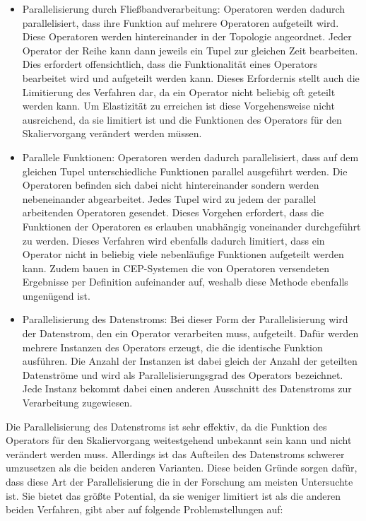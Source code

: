 \begin{itemize}
\item{Parallelisierung durch Fließbandverarbeitung: Operatoren werden dadurch parallelisiert, dass ihre Funktion auf mehrere Operatoren aufgeteilt wird.
Diese Operatoren werden hintereinander in der Topologie angeordnet.
Jeder Operator der Reihe kann dann jeweils ein Tupel zur gleichen Zeit bearbeiten.
Dies erfordert offensichtlich, dass die Funktionalität eines Operators bearbeitet wird und aufgeteilt werden kann.
Dieses Erfordernis stellt auch die Limitierung des Verfahren dar, da ein Operator nicht beliebig oft geteilt werden kann.
Um Elastizität zu erreichen ist diese Vorgehensweise nicht ausreichend, da sie limitiert ist und die Funktionen des Operators für den Skaliervorgang verändert werden müssen.}

\item{Parallele Funktionen: Operatoren werden dadurch parallelisiert, dass auf dem gleichen Tupel unterschiedliche Funktionen parallel ausgeführt werden.
Die Operatoren befinden sich dabei nicht hintereinander sondern werden nebeneinander abgearbeitet.
Jedes Tupel wird zu jedem der parallel arbeitenden Operatoren gesendet.
Dieses Vorgehen erfordert, dass die Funktionen der Operatoren es erlauben unabhängig voneinander durchgeführt zu werden.
Dieses Verfahren wird ebenfalls dadurch limitiert, dass ein Operator nicht in beliebig viele nebenläufige Funktionen aufgeteilt werden kann.
Zudem bauen in CEP-Systemen die von Operatoren versendeten Ergebnisse per Definition aufeinander auf, weshalb diese Methode ebenfalls ungenügend ist.}

\item{Parallelisierung des Datenstroms: Bei dieser Form der Parallelisierung wird der Datenstrom, den ein Operator verarbeiten muss, aufgeteilt.
Dafür werden mehrere Instanzen des Operators erzeugt, die die identische Funktion ausführen.
Die Anzahl der Instanzen ist dabei gleich der Anzahl der geteilten Datenströme und wird als Parallelisierungsgrad des Operators bezeichnet.
Jede Instanz bekommt dabei einen anderen Ausschnitt des Datenstroms zur Verarbeitung zugewiesen.}

\end{itemize}

Die Parallelisierung des Datenstroms ist sehr effektiv, da die Funktion des Operators für den Skaliervorgang weitestgehend unbekannt sein kann und nicht verändert werden muss.
Allerdings ist das Aufteilen des Datenstroms schwerer umzusetzen als die beiden anderen Varianten.
Diese beiden Gründe sorgen dafür, dass diese Art der Parallelisierung die in der Forschung am meisten Untersuchte ist.
Sie bietet das größte Potential, da sie weniger limitiert ist als die anderen beiden Verfahren, gibt aber auf folgende Problemstellungen auf:

